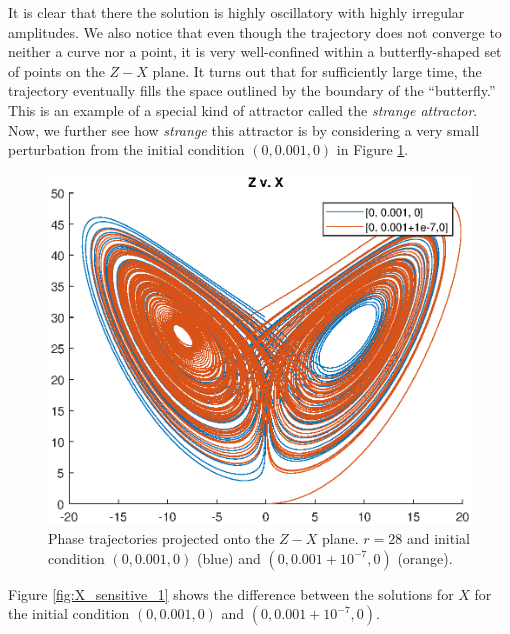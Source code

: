 \documentclass[twocolumn,amsmath,amssymb,aps]{revtex4}
\begin{document}
It is clear that there the solution is highly oscillatory with highly irregular amplitudes. We also notice that even though the trajectory does not converge to neither a curve nor a point, it is very well-confined within a butterfly-shaped set of points on the $Z-X$ plane. It turns out that for sufficiently large time, the trajectory eventually fills the space outlined by the boundary of the ``butterfly.'' This is an example of a special kind of attractor called the \textit{strange attractor}. Now, we further see how \textit{strange} this attractor is by considering a very small perturbation from the initial condition $(0,0.001,0)$ in Figure \ref{fig:lorenz_butterfly_2}.
\begin{figure}[!htb]
	\centering
	\includegraphics[scale=0.5]{ZX_butterfly_sensitive}
	\caption{Phase trajectories projected onto the $Z-X$ plane. $r=28$ and initial condition $(0,0.001,0)$ (blue) and $(0,0.001+10^{-7},0)$ (orange).}
	\label{fig:lorenz_butterfly_2}
\end{figure}
Figure \ref{fig:X_sensitive_1} shows the difference between the solutions for $X$ for the initial condition $(0,0.001,0)$ and $(0,0.001+10^{-7},0)$. 
\end{document}
